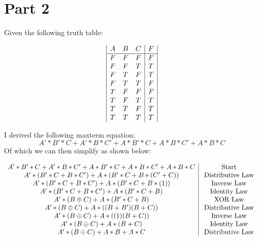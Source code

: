 \section{Part 2}
Given the following truth table:
\begin{center}
    \begin{displaymath}
    \begin{array}{|c c c|c|}
      A & B & C & F \\
    \hline
      F & F & F & F \\
      F & F & T & T \\
      F & T & F & T \\
      F & T & T & F \\
      T & F & F & F \\
      T & F & T & T \\
      T & T & F & T \\
      T & T & T & T \\
    \end{array}
    \end{displaymath}
\end{center}
I derived the following maxterm equation:
$$ A'*B'*C + A'*B*C' + A*B'*C + A*B*C' + A*B*C $$
Of which we can then simplify as shown below:\newline
\begin{centering}
  \begin{displaymath}
  \begin{array}{c | c}
    A'*B'*C + A'*B*C' + A*B'*C + A*B*C' + A*B*C & $Start$ \\
    A'*(B'*C + B*C') + A*(B'*C + B*(C' + C))    & $ Distributive Law $ \\
    A'*(B'*C + B*C') + A*(B'*C + B*(1))         & $ Inverse Law $ \\
    A'*(B'*C + B*C') + A*(B'*C + B)         & $ Identity Law $ \\
    A'*(B \oplus C) + A*(B'*C + B)              & $ XOR Law $ \\
    A'*(B \oplus C) + A*((B + B')(B + C))       & $ Distributive Law $ \\
    A'*(B \oplus C) + A*((1)(B + C))            & $ Inverse Law $ \\
    A'*(B \oplus C) + A*(B + C)                 & $ Identity Law $ \\
    A'*(B \oplus C) + A*B + A*C                 & $ Distributive Law $ \\
  \end{array}
  \end{displaymath}
\end{centering}
